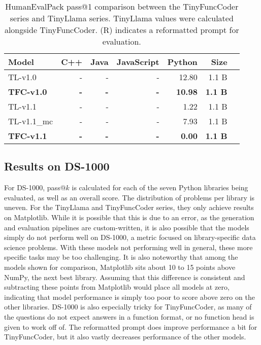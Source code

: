 \begin{table}[!h]
    \centering
    \caption{HumanEvalPack pass@1 comparison between the TinyFuncCoder series and TinyLlama series. TinyLlama values were calculated alongside TinyFuncCoder. (R) indicates a reformatted prompt for evaluation.}
    \begin{tabular}{l|rrrrr|r}
        \hline
        Model & C++ & Java & JavaScript & Python & Size \\
        \hline
        TL-v1.0 & - & - & - & 12.80 & 1.1 B \\
        \textbf{TFC-v1.0} & \textbf{-} & \textbf{-} & \textbf{-} & \textbf{10.98} & \textbf{1.1 B} \\
        TL-v1.1 & - & - & - & 1.22 & 1.1 B \\
        TL-v1.1\_mc & - & - & - & 7.93 & 1.1 B \\
        \textbf{TFC-v1.1} & \textbf{-} & \textbf{-} & \textbf{-} & \textbf{0.00} & \textbf{1.1 B} \\
        \hline
    \end{tabular}
    \label{tab:humevpack}
\end{table}


\subsection{Results on DS-1000}
\label{sec:ds1000res}

For DS-1000, pass@$k$ is calculated for each of the seven Python libraries being evaluated, as well as an overall score.
The distribution of problems per library is uneven.
For the TinyLlama and TinyFuncCoder series, they only achieve results on Matplotlib.
While it is possible that this is due to an error, as the generation and evaluation pipelines are custom-written, it is also possible that the models simply do not perform well on DS-1000, a metric focused on library-specific data science problems.
With these models not performing well in general, these more specific tasks may be too challenging.
It is also noteworthy that among the models shown for comparison, Matplotlib sits about 10 to 15 points above NumPy, the next best library.
Assuming that this difference is consistent and subtracting these points from Matplotlib would place all models at zero, indicating that model performance is simply too poor to score above zero on the other libraries.
DS-1000 is also especially tricky for TinyFuncCoder, as many of the questions do not expect answers in a function format, or no function head is given to work off of.
The reformatted prompt does improve performance a bit for TinyFuncCoder, but it also vastly decreases performance of the other models.

